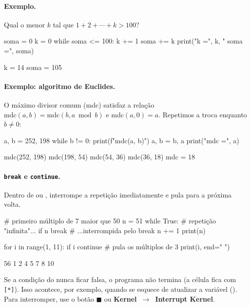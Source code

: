 {{\paragraph{Exemplo.} Qual o menor $k$ tal que $1+2+\cdots+k>100$?

\begin{entrada}
soma = 0
k = 0
while soma <= 100:
    k += 1
    soma += k
print("k =", k, "  soma =", soma)
\end{entrada}
\begin{saida}
k = 14   soma = 105
\end{saida}

\paragraph{Exemplo: algoritmo de Euclides.} O máximo divisor comum (mdc) satisfaz a relação $\mathrm{mdc}(a,b)=\mathrm{mdc}(b, a \bmod b)$
e $\mathrm{mdc}(a,0)=a$. Repetimos a troca enquanto $b\neq 0$:

\begin{entrada}
a, b = 252, 198
while b != 0:
    print(f"mdc({a}, {b})")
    a, b = b, a %
print("mdc =", a)
\end{entrada}
\begin{saida}
mdc(252, 198)
mdc(198, 54)
mdc(54, 36)
mdc(36, 18)
mdc = 18
\end{saida}

\paragraph{\texttt{break} e \texttt{continue}.} Dentro de  ou ,  interrompe a repetição
imediatamente e  pula para a próxima volta.

\begin{entrada}
# primeiro múltiplo de 7 maior que 50
n = 51
while True:          # repetição "infinita"...
    if n %
        break        # ...interrompida pelo break
    n += 1
print(n)

for i in range(1, 11):
    if i %
        continue     # pula os múltiplos de 3
    print(i, end=" ")
\end{entrada}
\begin{saida}
56
1 2 4 5 7 8 10
\end{saida}

\begin{atencao}
Se a condição do  nunca ficar falsa, o programa não termina (a célula fica com \texttt{[*]}). Isso
acontece, por exemplo, quando se esquece de atualizar a variável (). Para interromper, use o botão
$\blacksquare$ ou \textbf{Kernel~$\to$~Interrupt Kernel}.
\end{atencao}

}}
